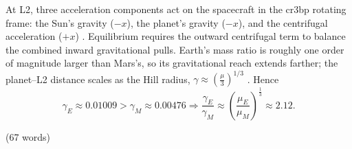 At L2, three acceleration components act on the spacecraft in the \ac{cr3bp} rotating frame: the Sun's gravity ($-x$), the planet's gravity ($-x$), and the centrifugal acceleration ($+x$) \parencite{wakker2015fundamentals,koon2000dynamical}. 
Equilibrium requires the outward centrifugal term to balance the combined inward gravitational pulls. 
Earth's mass ratio is roughly one order of magnitude larger than Mars's, so its gravitational reach extends farther; the planet--L2 distance scales as the Hill radius, $\gamma \approx \left(\frac{\mu}{3}\right)^{1/3}$ \parencite{szebehely1967theory}. %
Hence
\begin{equation}
  \gamma_E \approx 0.01009 > \gamma_M \approx 0.00476 \Rightarrow \frac{\gamma_E}{\gamma_M} \approx \left( \frac{\mu_E}{\mu_M} \right)^{\frac{1}{3}} \approx 2.12.
\end{equation} 

(67 words) %